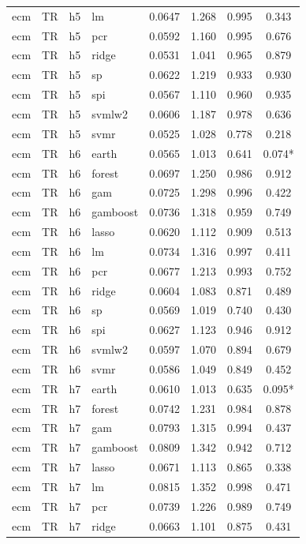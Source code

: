 \begin{ThreePartTable}
\begin{longtable}[t]{llclcccc}
ecm & TR & h5 & lm & 0.0647 & 1.268 & 0.995 & 0.343\\
ecm & TR & h5 & pcr & 0.0592 & 1.160 & 0.995 & 0.676\\
ecm & TR & h5 & ridge & 0.0531 & 1.041 & 0.965 & 0.879\\
ecm & TR & h5 & sp & 0.0622 & 1.219 & 0.933 & 0.930\\
ecm & TR & h5 & spi & 0.0567 & 1.110 & 0.960 & 0.935\\
ecm & TR & h5 & svmlw2 & 0.0606 & 1.187 & 0.978 & 0.636\\
ecm & TR & h5 & svmr & 0.0525 & 1.028 & 0.778 & 0.218\\
\addlinespace
ecm & TR & h6 & earth & 0.0565 & 1.013 & 0.641 & 0.074*\\
ecm & TR & h6 & forest & 0.0697 & 1.250 & 0.986 & 0.912\\
ecm & TR & h6 & gam & 0.0725 & 1.298 & 0.996 & 0.422\\
ecm & TR & h6 & gamboost & 0.0736 & 1.318 & 0.959 & 0.749\\
ecm & TR & h6 & lasso & 0.0620 & 1.112 & 0.909 & 0.513\\
ecm & TR & h6 & lm & 0.0734 & 1.316 & 0.997 & 0.411\\
ecm & TR & h6 & pcr & 0.0677 & 1.213 & 0.993 & 0.752\\
ecm & TR & h6 & ridge & 0.0604 & 1.083 & 0.871 & 0.489\\
ecm & TR & h6 & sp & 0.0569 & 1.019 & 0.740 & 0.430\\
ecm & TR & h6 & spi & 0.0627 & 1.123 & 0.946 & 0.912\\
ecm & TR & h6 & svmlw2 & 0.0597 & 1.070 & 0.894 & 0.679\\
ecm & TR & h6 & svmr & 0.0586 & 1.049 & 0.849 & 0.452\\
\addlinespace
ecm & TR & h7 & earth & 0.0610 & 1.013 & 0.635 & 0.095*\\
ecm & TR & h7 & forest & 0.0742 & 1.231 & 0.984 & 0.878\\
ecm & TR & h7 & gam & 0.0793 & 1.315 & 0.994 & 0.437\\
ecm & TR & h7 & gamboost & 0.0809 & 1.342 & 0.942 & 0.712\\
ecm & TR & h7 & lasso & 0.0671 & 1.113 & 0.865 & 0.338\\
ecm & TR & h7 & lm & 0.0815 & 1.352 & 0.998 & 0.471\\
ecm & TR & h7 & pcr & 0.0739 & 1.226 & 0.989 & 0.749\\
ecm & TR & h7 & ridge & 0.0663 & 1.101 & 0.875 & 0.431\\

\end{longtable}
\end{ThreePartTable}
